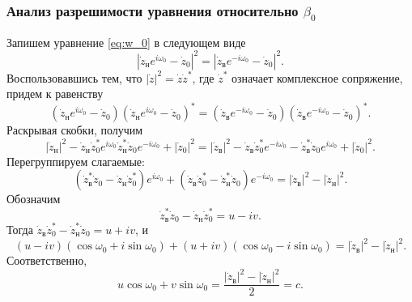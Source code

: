 \documentclass[../main.tex]{subfiles}
\begin{document}
\subsubsection{Анализ разрешимости уравнения относительно $\beta_0$}

Запишем уравнение \eqref{eq:w_0} в следующем виде
\begin{equation*}
  \left|\dot{z}_\text{н} e^{ i \omega_0} - \dot{z}_0 \right|^2 =
  \left|\dot{z}_\text{в} e^{-i \omega_0} - \dot{z}_0 \right|^2.
\end{equation*}
Воспользовавшись тем, что $\left|\dot{z}\right|^2= \dot{z} \dot{z}^*$, где $\dot{z}^*$ означает комплексное сопряжение, придем к равенству
\begin{equation*}
  \left(\dot{z}_\text{н} e^{ i\omega_0} - \dot{z}_0 \right) \left(\dot{z}_\text{н} e^{ i\omega_0} - \dot{z}_0 \right)^* = \left(\dot{z}_\text{в} e^{-i\omega_0} - \dot{z}_0 \right) \left(\dot{z}_\text{в} e^{-i\omega_0} - \dot{z}_0 \right)^*.
\end{equation*}
Раскрывая скобки, получим
\begin{equation*}
  \left|\dot{z}_\text{н}\right|^2 - \dot{z}_\text{н} \dot{z}_{0}^* e^{ i\omega_0} \dot{z}_\text{н}^* \dot{z}_{0} e^{-i\omega_0} + \left|\dot{z}_{0}\right|^2 =
  \left|\dot{z}_\text{в} \right|^2 - \dot{z}_\text{в} \dot{z}_{0}^* e^{-i\omega_0} - \dot{z}_\text{в}^* \dot{z}_{0} e^{i\omega_0} + \left|\dot{z}_{0}\right|^2.
\end{equation*}
Перегруппируем слагаемые:
\begin{equation*}
  \left(\dot{z}_\text{в}^* \dot{z}_{0} - \dot{z}_\text{н} \dot{z}_{0}^* \right) e^{ i\omega_0} + \left(\dot{z}_\text{в} \dot{z}_{0}^* - \dot{z}_\text{н}^* \dot{z}_{0} \right) e^{-i\omega_0} = \left|\dot{z}_\text{в}\right|^2 - \left|\dot{z}_\text{н}\right|^2.
\end{equation*}
Обозначим
\begin{equation} \label{eq:u_v}
  \dot{z}_\text{в}^* \dot{z}_{0} - \dot{z}_\text{н} \dot{z}_{0}^* = u - iv.
\end{equation}
Тогда $\dot{z}_\text{в} \dot{z}_{0}^* - \dot{z}_\text{н}^* \dot{z}_{0} = u + iv$, и
\begin{equation*}
  \left(u - iv\right) \left(\cos\omega_0 + i \sin\omega_0\right) + \left(u + iv\right) \left(\cos\omega_0 - i \sin\omega_0\right) = \left|\dot{z}_\text{в}\right|^2 - \left|\dot{z}_\text{н}\right|^2.
\end{equation*}
Соответственно,
\begin{equation} \label{eq:u_v_omega_0}
  u \cos\omega_0 + v \sin\omega_0 =
  \frac{ \left|\dot{z}_\text{в}\right|^2 - \left|\dot{z}_\text{н}\right|^2} {2}=c.
\end{equation}
\end{document}
